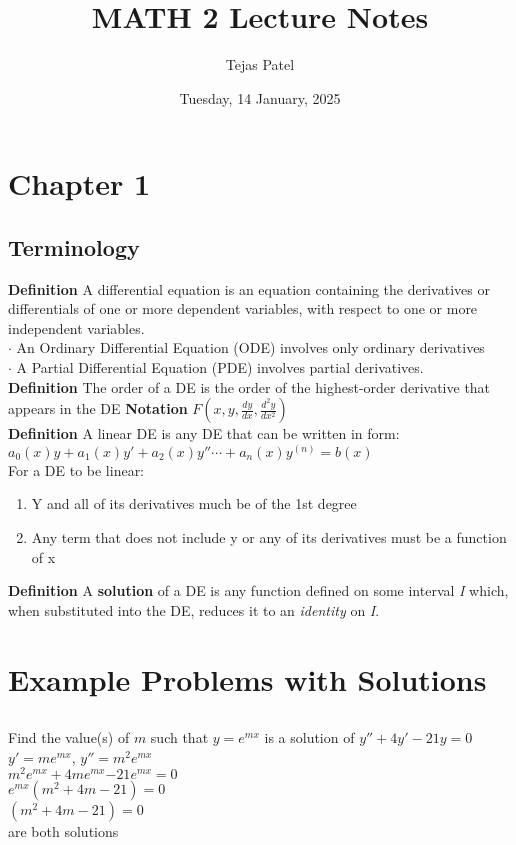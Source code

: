\documentclass{article}
\title{MATH 2 Lecture Notes}
\date{Tuesday, 14 January, 2025}
\author{Tejas Patel}
\begin{document}
\maketitle
\tableofcontents
\pagebreak
\section{Chapter 1}
\subsection{Terminology}
\textbf{Definition} A differential equation is an equation containing the derivatives or differentials 
of one or more dependent variables, with respect to one or more independent variables.\\
\textbf{$\cdot$} An Ordinary Differential Equation (ODE) involves only ordinary derivatives\\
\textbf{$\cdot$} A Partial Differential Equation (PDE) involves partial derivatives.\\
\textbf{Definition} The order of a DE is the order of the highest-order derivative that appears in the DE
\textbf{Notation} $F(x,y,\frac{dy}{dx}, \frac{d^2y}{dx^2})$\\
\textbf{Definition} A linear DE is any DE that can be written in form:\\
${\displaystyle a_{0}(x)y+a_{1}(x)y'+a_{2}(x)y''\cdots +a_{n}(x)y^{(n)}=b(x)}$\\
For a DE to be linear:
\begin{enumerate}
    \item Y and all of its derivatives much be of the 1st degree
    \item Any term that does not include y or any of its derivatives must be a function of x
\end{enumerate}
\textbf{Definition} A \textbf{solution} of a DE is any function defined on some interval \textit{I} which, when substituted
into the DE, reduces it to an \textit{identity} on \textit{I}.

\pagebreak
\section{Example Problems with Solutions}
\subsection{}
Find the value(s) of $m$ such that $y=e^{mx}$ is a solution of $y''+4y'-21y=0$\\
$y'=me^{mx}$, $y''=m^2e^{mx}$\\
$m^2e^{mx}+4me^{mx}{-21e^{mx}=0}$\\
$e^{mx}(m^2+4m-21) = 0$\\ 
$(m^2+4m-21) = 0$ \\ 
 are both solutions
\end{document}
